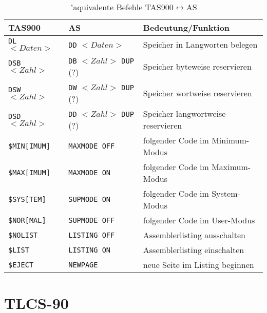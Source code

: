 \documentclass[12pt,a4paper,twoside]{report}
\newcommand{\tty}[1]{{\tt #1}}
\begin{document}
\begin{table*}[htbp]
\begin{center}\begin{tabular}{|l|l|l|}
\hline
TAS900        &   AS                & Bedeutung/Funktion \\
\hline
\hline
\tty{DL} $<Daten>$  & \tty{DD} $<Daten>$              & Speicher in Langworten belegen \\
\hline
\tty{DSB} $<Zahl>$  & \tty{DB} $<Zahl>$ \tty{DUP} (?) & Speicher byteweise reservieren \\
\hline
\tty{DSW} $<Zahl>$  & \tty{DW} $<Zahl>$ \tty{DUP} (?) & Speicher wortweise reservieren \\
\hline
\tty{DSD} $<Zahl>$  & \tty{DD} $<Zahl>$ \tty{DUP} (?) & Speicher langwortweise reservieren \\
\hline
\tty{\$MIN[IMUM]}   & \tty{MAXMODE OFF}         & folgender Code im Minimum-Modus \\
\hline
\tty{\$MAX[IMUM]}   & \tty{MAXMODE ON}          & folgender Code im Maximum-Modus \\
\hline
\tty{\$SYS[TEM]}    & \tty{SUPMODE ON}          & folgender Code im System-Modus \\
\hline
\tty{\$NOR[MAL]}    & \tty{SUPMODE OFF}         & folgender Code im User-Modus \\
\hline
\tty{\$NOLIST}      & \tty{LISTING OFF}         & Assemblerlisting ausschalten \\
\hline
\tty{\$LIST}        & \tty{LISTING ON}          & Assemblerlisting einschalten \\
\hline
\tty{\$EJECT}       & \tty{NEWPAGE}             & neue Seite im Listing beginnen \\
\hline
\end{tabular}\end{center}
\caption{"aquivalente Befehle TAS900$\leftrightarrow$AS\label{TabTAS900}}
\end{table*}


\section{TLCS-90}
\end{document}
